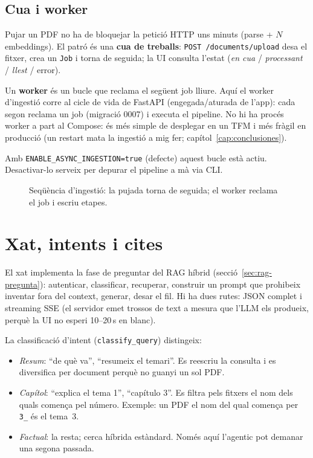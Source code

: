 \subsection{Cua i worker}

Pujar un PDF no ha de bloquejar la petició HTTP uns minuts (parse + $N$ embeddings). El patró és una \textbf{cua de treballs}: \texttt{POST /documents/upload} desa el fitxer, crea un \texttt{Job} i torna de seguida; la UI consulta l'estat (\emph{en cua} / \emph{processant} / \emph{llest} / error).

Un \textbf{worker} és un bucle que reclama el següent job lliure. Aquí el worker d'ingestió corre al cicle de vida de FastAPI (engegada/aturada de l'app): cada segon reclama un job (migració 0007) i executa el pipeline. No hi ha procés worker a part al Compose: és més simple de desplegar en un TFM i més fràgil en producció (un restart mata la ingestió a mig fer; capítol~\ref{cap:conclusiones}).

Amb \texttt{ENABLE\_ASYNC\_INGESTION=true} (defecte) aquest bucle està actiu. Desactivar-lo serveix per depurar el pipeline a mà via CLI.

\begin{figure}[htbp]
\centering

\caption{Seqüència d'ingestió: la pujada torna de seguida; el worker reclama el job i escriu etapes.}
\label{fig:seq-ingest}
\end{figure}

\section{Xat, intents i cites}

El xat implementa la fase de preguntar del RAG híbrid (secció~\ref{sec:rag-pregunta}): autenticar, classificar, recuperar, construir un prompt que prohibeix inventar fora del context, generar, desar el fil. Hi ha dues rutes: JSON complet i streaming SSE (el servidor emet trossos de text a mesura que l'LLM els produeix, perquè la UI no esperi 10--20\,s en blanc).

La classificació d'intent (\texttt{classify\_query}) distingeix:

\begin{itemize}
  \item \emph{Resum}: ``de què va'', ``resumeix el temari''. Es reescriu la consulta i es diversifica per document perquè no guanyi un sol PDF.
  \item \emph{Capítol}: ``explica el tema 1'', ``capítulo 3''. Es filtra pels fitxers el nom dels quals comença pel número. Exemple: un PDF el nom del qual comença per \texttt{3\_} és el tema~3.
  \item \emph{Factual}: la resta; cerca híbrida estàndard. Només aquí l'agentic pot demanar una segona passada.
\end{itemize}

